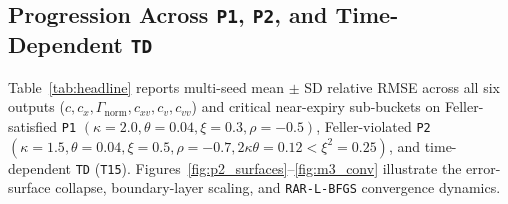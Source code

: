\documentclass[preprint,12pt]{elsarticle}
\begin{document}
\subsection{Progression Across \texttt{P1}, \texttt{P2}, and Time-Dependent \texttt{TD}}

Table~\ref{tab:headline} reports multi-seed mean $\pm$ SD relative RMSE across all six outputs ($c, c_x, \Gamma_{\mathrm{norm}}, c_{xv}, c_v, c_{vv}$) and critical near-expiry sub-buckets on Feller-satisfied \texttt{P1} $(\kappa=2.0,\theta=0.04,\xi=0.3,\rho=-0.5)$, Feller-violated \texttt{P2} $(\kappa=1.5,\theta=0.04,\xi=0.5,\rho=-0.7, 2\kappa\theta=0.12 < \xi^2=0.25)$, and time-dependent \texttt{TD} (\texttt{T15}). Figures~\ref{fig:p2_surfaces}--\ref{fig:m3_conv} illustrate the error-surface collapse, boundary-layer scaling, and \texttt{RAR-L-BFGS} convergence dynamics.
\end{document}

